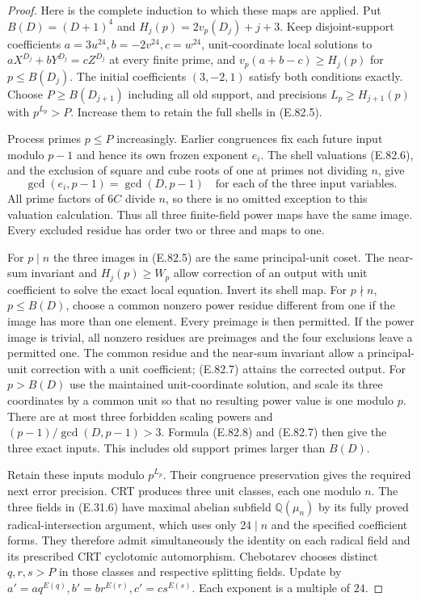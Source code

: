 \begin{proof}
Here is the complete induction to which these maps are applied.
Put $B(D)=(D+1)^4$ and $H_j(p)=2v_p(D_j)+j+3$.
Keep disjoint-support coefficients
$a=3u^{24},b=-2v^{24},c=w^{24}$, unit-coordinate local
solutions to $aX^{D_j}+bY^{D_j}=cZ^{D_j}$ at every finite
prime, and $v_p(a+b-c)\geq H_j(p)$ for $p\leq B(D_j)$.
The initial coefficients $(3,-2,1)$ satisfy both conditions
exactly. Choose $P\geq B(D_{j+1})$ including all old support,
and precisions $L_p\geq H_{j+1}(p)$ with $p^{L_p}>P$.
Increase them to retain the full shells in (E.82.5).

Process primes $p\leq P$ increasingly. Earlier congruences
fix each future input modulo $p-1$ and hence its own frozen
exponent $e_i$. The shell valuations (E.82.6), and the exclusion
of square and cube roots of one at primes not dividing $n$, give
\[
 \gcd(e_i,p-1)=\gcd(D,p-1)
       \quad\text{for each of the three input variables}.
 \tag{E.82.8}
\]
All prime factors of $6C$ divide $n$, so there is no omitted
exception to this valuation calculation. Thus all three
finite-field power maps have the same image. Every excluded
residue has order two or three and maps to one.

For $p\mid n$ the three images in (E.82.5) are the same
principal-unit coset. The near-sum invariant and
$H_j(p)\geq W_p$ allow correction of an output with unit
coefficient to solve the exact local equation. Invert its
shell map. For $p\nmid n$, $p\leq B(D)$, choose a common
nonzero power residue different from one if the image has
more than one element. Every preimage is then permitted.
If the power image is trivial, all nonzero residues are
preimages and the four exclusions leave a permitted one.
The common residue and the near-sum invariant allow a
principal-unit correction with a unit coefficient; (E.82.7)
attains the corrected output. For $p>B(D)$ use the maintained
unit-coordinate solution, and scale its three coordinates by
a common unit so that no resulting power value is one modulo
$p$. There are at most three forbidden scaling powers and
$(p-1)/\gcd(D,p-1)>3$. Formula (E.82.8) and (E.82.7)
then give the three exact inputs. This includes old support
primes larger than $B(D)$.

Retain these inputs modulo $p^{L_p}$. Their congruence
preservation gives the required next error precision.
CRT produces three unit classes, each one modulo $n$.
The three fields in (E.31.6) have maximal abelian subfield
$\mathbb Q(\mu_n)$ by its fully proved radical-intersection
argument, which uses only $24\mid n$ and the specified
coefficient forms. They therefore admit simultaneously the
identity on each radical field and its prescribed CRT
cyclotomic automorphism. Chebotarev chooses distinct
$q,r,s>P$ in those classes and respective splitting fields.
Update by $a'=aq^{E(q)},b'=br^{E(r)},c'=cs^{E(s)}$.
Each exponent is a multiple of $24$.


\end{proof}
